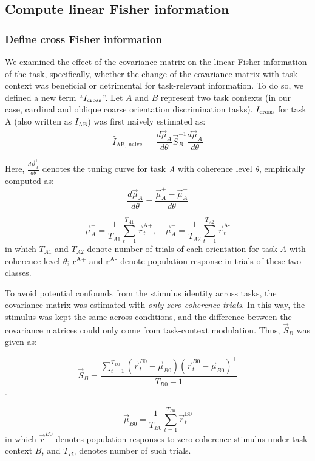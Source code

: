 \documentclass[lineno,pdflatex,sn-basic]{sn-jnl}%
\newcommand{\Icross}{I_{\rm cross}}
\theoremstyle{thmstyleone}%
\theoremstyle{thmstyletwo}%
\theoremstyle{thmstylethree}%
\begin{document}
\subsection{Compute linear Fisher information }
\subsubsection{Define cross Fisher information} \label{sec_ch2:cross_fisher} We examined the effect of the covariance matrix on the linear Fisher information of the task, specifically, whether the change of the covariance matrix with task context was beneficial or detrimental for task-relevant information. To do so, we defined a new term ``$\Icross$''. Let $A$ and $B$ represent two task contexts (in our case, cardinal and oblique coarse orientation discrimination tasks). $\Icross$ for task A (also written as $I_\textrm{AB}$) was first naively estimated as:
\begin{equation}
    \hat{I}_{\text {AB, naive }}=\frac{d \vec{\mu}_A^{\top}}{d \theta} \vec{S}_B^{-1} \frac{d \vec{\mu}_A}{d \theta}
    \label{eq_I_cross}
\end{equation}

Here, $\frac{d \vec{\mu}_A^{\top}}{d \theta}$ denotes the tuning curve for task $A$ with coherence level $\theta$, empirically computed as:
\[\frac{d\vec{\mu}_A}{d\theta} = \frac{\vec{\mu}^{+}_A - \vec{\mu}^{-}_A}{d\theta}\]

\[\vec{\mu}^{+}_A = \frac{1}{T_{A1}} \sum_{t=1}^{T_{A1}}\vec{r}_t^{\textrm{A+}}, \quad
\vec{\mu}^{-}_A = \frac{1}{T_{A2}} \sum_{t=1}^{T_{A2}}\vec{r}_t^{\textrm{A-}}\]
in which $T_{A1}$ and $T_{A2}$ denote number of trials of each orientation for task $A$ with coherence level $\theta$;  $\mathbf{r^{\textrm{A+}}}$ and $\mathbf{r^{\textrm{A-}}}$ denote population response in trials of these two classes.

To avoid potential confounds from the stimulus identity across tasks, the covariance matrix was estimated with \emph{only zero-coherence trials}. In this way, the stimulus was kept the same across conditions, and the difference between the covariance matrices could only come from task-context modulation. Thus, $\vec{S}_B$ was given as:

\[\vec{S}_B=\frac{\sum_{t=1}^{T_{B0}}\left(\vec{r}_t^{B0}-\vec{\mu}_{B0}\right)\left(\vec{r}_t^{B0}-
\vec{\mu}_{B0}\right)^{\top}}{T_{B0} - 1}\].

\[\vec{\mu}_{B0} = \frac{1}{T_{B0}}\sum_{t=1}^{T_{B0}}\vec{r}_t^{\textrm{B0}}\]
in which $\vec{r}^{B0}$ denotes population responses to zero-coherence stimulus under task context $B$, and $T_{B0}$ denotes number of such trials.
\end{document}
